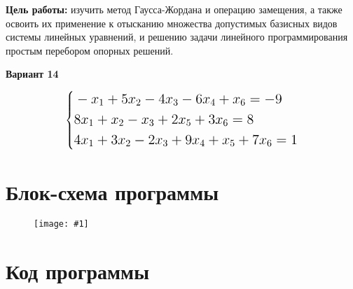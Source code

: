 \documentclass{report}
\newcommand{\drawsosal}[2]{
	\begin{figure}[H]
		\centering
		\texttt{[image: \#1]}
	\end{figure}
}
\begin{document}
	\textbf{Цель работы:} изучить метод Гаусса-Жордана и операцию
	замещения, а также освоить их применение к отысканию множества
	допустимых базисных видов системы линейных уравнений, и решению
	задачи линейного программирования простым перебором опорных
	решений.
	\begin{center}
		\textbf{Вариант 14}
	\end{center}
	\bigbreak
	\[
	\Large\left\{
	\begin{aligned}
		&-x_1 + 5x_2 - 4x_3 - 6x_4 + x_6 = -9 \\
		&8x_1 + x_2 - x_3 + 2x_5 + 3x_6 = 8 \\
		&4x_1 + 3x_2 - 2x_3 + 9x_4 + x_5 + 7x_6 = 1
	\end{aligned}
	\right.
	\]
	\tableofcontents
	
	\chapter{Блок-схема программы}
	
	\drawsosal{images/block.png}{0.61}
	
	\newpage
	
	\chapter{Код программы}
\end{document}
